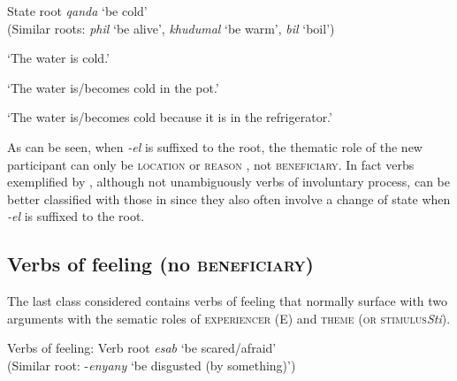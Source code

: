 \documentclass[output=paper]{langsci/langscibook}
\begin{document}
\ea\label{ex:sibanda:16}
\settowidth{}
{State root \textit{qanda} ‘be cold’}\\
 (Similar roots: \textit{phil} ‘be alive’, \textit{khudumal} ‘be warm’, \textit{bil} ‘boil’)\\

\glt ‘The water is cold.’


\glt ‘The water is/becomes cold in the pot.’


\glt ‘The water is/becomes cold because it is in the refrigerator.’
\z
\z

As can be seen, when \textit{-el} is suffixed to the root, the thematic role of the new participant can only be \textsc{location}  or \textsc{reason} , not \textsc{beneficiary}. In fact  verbs exemplified by , although not unambiguously verbs of involuntary process, can be better classified with those in  since they also often involve a change of state when \textit{-el} is suffixed to the root.

\subsection{Verbs of feeling (no \textsc{beneficiary)}}\label{sec:sibanda:4.6}

The last class considered contains verbs of feeling that normally surface with two arguments with the sematic roles of \textsc{experiencer} (E) and \textsc{theme} (\textsc{or stimulus}\textit {Sti}). 

\ea\label{ex:sibanda:17}
\settowidth{}
{Verbs of feeling: Verb root \textit{esab} ‘be scared/afraid’}\\
 (Similar root: -\textit{enyany} ‘be disgusted (by something)’)\\
\end{document}

